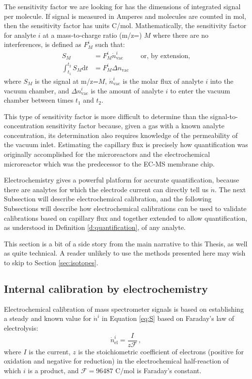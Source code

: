 The sensitivity factor we are looking for has the dimensions of integrated signal per molecule. If signal is measured in Amperes and molecules are counted in mol, then the sensitivity factor has units C/mol. Mathematically, the sensitivity factor for analyte $i$ at a mass-to-charge ratio (m/z=) $M$ where there are no interferences, is defined as $F^i_M$ such that:
\begin{align}
S_M &= F_M^i \dot{n}^i_{\text{vac}}\,\hspace{1cm}\text{or, by extension,} \label{eq:S}\\
\int_{t_1}^{t_2} S_M \mathrm{d}t &= F_M^i \Delta n_{\text{vac}} \label{eq:int_S}
\end{align}
where $S_M$ is the signal at m/z=$M$, $\dot{n}^i_\text{vac}$ is the molar flux of analyte $i$ into the vacuum chamber, and $\Delta n_\text{vac}^i$ is the amount of analyte $i$ to enter the vacuum chamber between times $t_1$ and $t_2$.

This type of sensitivity factor is more difficult to determine than the signal-to-concentration sensitivity factor because, given a gas with a known analyte concentration, its determination also requires knowledge of the permeability of the vacuum inlet. Estimating the capillary flux is precisely how quantification was originally accomplished for the microreactors \cite{Henriksen2009} and the electrochemical microreactor which was the predecessor to the EC-MS membrane chip\cite{Trimarco2015}. 

Electrochemistry gives a powerful platform for accurate quantification, because there are analytes for which the electrode current can directly tell us $\dot{n}$. The next Subsection will describe electrochemical calibration, and the following Subsections will describe how electrochemical calibrations can be used to validate calibrations based on capillary flux and together extended to allow quantification, as understood in Definition \ref{d:quantification}, of any analyte.

This section is a bit of a side story from the main narrative to this Thesis, as well as quite technical. A reader unlikely to use the methods presented here may wish to skip to Section \ref{sec:isotopes}.

\subsection{Internal calibration by electrochemistry}\label{subsec:internal}

Electrochemical calibration of mass spectrometer signals is based on establishing a steady and known value for $\dot{n}^i$ in Equation \ref{eq:S} based on Faraday's law of electrolysis:
\begin{equation}
\dot{n}^i_\text{el} = \frac{I}{z\mathcal{F}}\,,\label{eq:Far}
\end{equation}
where $I$ is the current, $z$ is the stoichiometric coefficient of electrons (positive for oxidation and negative for reduction) in the electrochemical half-reaction of which $i$ is a product, and $\mathcal{F}=96487$ C/mol is Faraday's constant.

